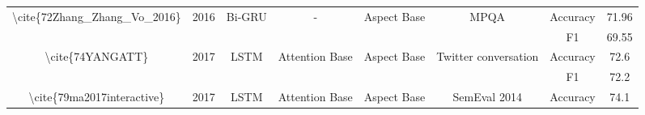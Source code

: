 \begin{table}[]
\begin{tabular}{|c|c|c|c|c|c|cc|}
    \multirow{2}{*}{\textbackslash{}cite\{72Zhang\_Zhang\_Vo\_2016\}}                     & \multirow{2}{*}{2016}                      & \multirow{2}{*}{Bi-GRU}                           & \multirow{2}{*}{-}                                        & \multirow{2}{*}{Aspect Base}                                                                                           & \multirow{2}{*}{MPQA}                                 & \multicolumn{1}{c|}{Accuracy}                                                                                                      & 71.96                      \\ \cline{7-8} 
                                                                                          &                                            &                                                   &                                                           &                                                                                                                        &                                                       & \multicolumn{1}{c|}{F1}                                                                                                            & 69.55                      \\ \hline
    \multirow{2}{*}{\textbackslash{}cite\{74YANGATT\}}                                    & \multirow{2}{*}{2017}                      & \multirow{2}{*}{LSTM}                             & \multirow{2}{*}{Attention Base}                           & \multirow{2}{*}{Aspect Base}                                                                                           & \multirow{2}{*}{Twitter conversation}                 & \multicolumn{1}{c|}{Accuracy}                                                                                                      & 72.6                       \\ \cline{7-8} 
                                                                                          &                                            &                                                   &                                                           &                                                                                                                        &                                                       & \multicolumn{1}{c|}{F1}                                                                                                            & 72.2                       \\ \hline
    \textbackslash{}cite\{79ma2017interactive\}                                           & 2017                                       & LSTM                                              & Attention Base                                            & Aspect Base                                                                                                            & SemEval 2014                                          & \multicolumn{1}{c|}{Accuracy}                                                                                                      & 74.1                       \\ \hline

\end{tabular}
\end{table}
